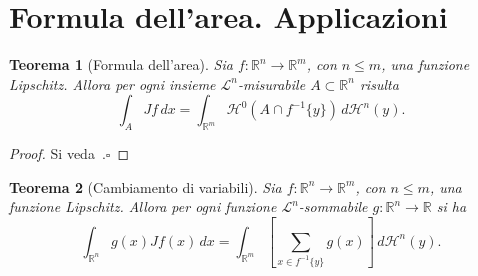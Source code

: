 \documentclass[a4paper,10pt,openright,oneside]{book}
\theoremstyle{theoremstyle}
\newtheorem{teorema}{Teorema}[section]
\theoremstyle{theoremstylewoheader}
\theoremstyle{theoremstyle}
\theoremstyle{proofsecstyle}
\theoremstyle{nonumberplain}
\newtheorem{proof}{Dim.}
\newcommand{\RR}{\ensuremath{\mathbb{R}}}
\newcommand{\Leb}{\ensuremath{\mathcal{L}}}
\newcommand{\Haus}{\ensuremath{\mathcal{H}}}
\renewcommand{\qedsymbol}{\ensuremath{\square}}
\newcommand{\qed}{\unskip\nobreak\hfill\nobreak\hspace{.5em}\qedsymbol}
\begin{document}
\section{Formula dell'area. Applicazioni}

\begin{teorema}[Formula dell'area]
\label{thm:formula_area}
Sia $f : \RR^n \rightarrow \RR^m$, con $n \le m$, una funzione Lipschitz. Allora per ogni insieme $\Leb^n$-misurabile $A \subset \RR^n$ risulta
\[
\int_A Jf\, dx = \int_{\RR^m} \Haus^0(A \cap f^{-1}\{y\})\, d\Haus^n(y).
\]
\end{teorema}

\begin{proof}
Si veda~\cite[Theorem~1, Section~3.3.2, pag.~96]{evans}.\qed
\end{proof}

\begin{teorema}[Cambiamento di variabili]
\label{thm:cambiamento_variabili_area}
Sia $f : \RR^n \rightarrow \RR^m$, con $n \le m$, una funzione Lipschitz. Allora per ogni funzione $\Leb^n$-sommabile $g : \RR^n \rightarrow \RR$ si ha
\[
\int_{\RR^n} g(x) Jf(x)\, dx = \int_{\RR^m} \left[\sum_{x \in f^{-1}\{y\}} g(x)\right]\, d\Haus^n(y).
\]
\end{teorema}
\end{document}
